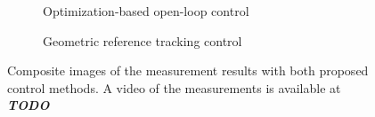 \setlength{\fboxsep}{0pt}%
\setlength{\fboxrule}{1pt}%

\begin{figure}
\centering
\begin{subfigure}{.5\textwidth}
  \centering
  \caption{Optimization-based open-loop control}
  \label{fig:sub1}
\end{subfigure}%
\begin{subfigure}{.5\textwidth}
  \centering
  \caption{Geometric reference tracking control}
  \label{fig:sub2}
\end{subfigure}
\caption{Composite images of the measurement results with both proposed control methods. A video of the measurements is available at \textit{\textbf{TODO}}}
\label{fig:test}
\end{figure}